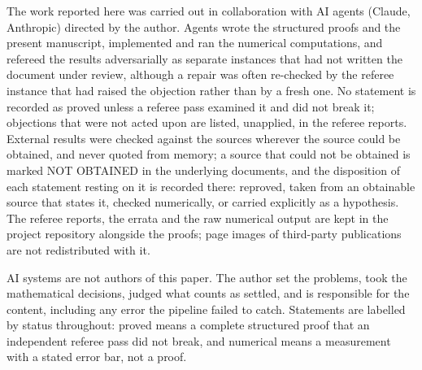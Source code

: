 \documentclass[11pt,a4paper]{article}
\theoremstyle{definition}\newtheorem{definition}[theorem]{Definition}\newtheorem{remark}[theorem]{Remark}
\begin{document}
The work reported here was carried out in collaboration with AI agents (Claude, Anthropic)
directed by the author. Agents wrote the structured proofs and the present manuscript,
implemented and ran the numerical computations, and refereed the results adversarially as
separate instances that had not written the document under review, although a repair was
often re-checked by the referee instance that had raised the objection rather than by a fresh
one. No statement is recorded as proved unless a referee pass examined it and did not break
it; objections that were not acted upon are listed, unapplied, in the referee reports.
External results were checked against the sources wherever the source could be obtained, and
never quoted from memory; a source that could not be obtained is marked NOT OBTAINED in the
underlying documents, and the disposition of each statement resting on it is recorded there:
reproved, taken from an obtainable source that states it, checked numerically, or carried
explicitly as a hypothesis. The referee reports, the errata and the raw
numerical output are kept in the project repository alongside the proofs; page images of
third-party publications are not redistributed with it.

AI systems are not authors of this paper. The author set the problems, took the mathematical
decisions, judged what counts as settled, and is responsible for the content, including any
error the pipeline failed to catch. Statements are labelled by status throughout: proved
means a complete structured proof that an independent referee pass did not break, and
numerical means a measurement with a stated error bar, not a proof.
\end{document}

